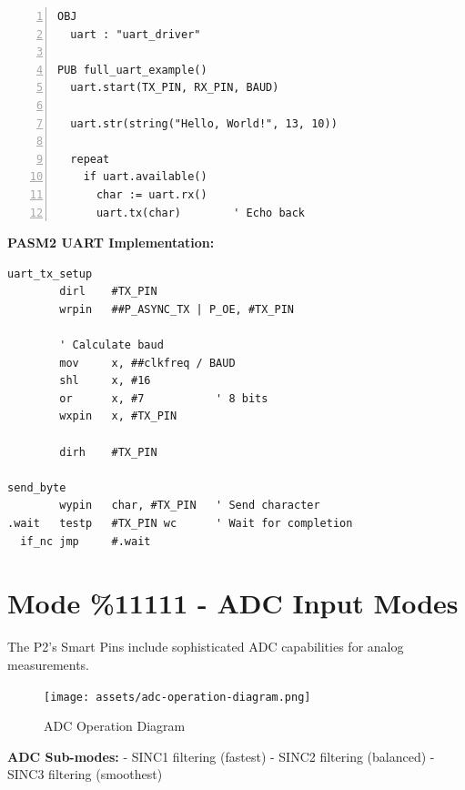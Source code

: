 \documentclass[11pt,a4paper,oneside,english]{book}
\begin{document}
\begin{Spin2Block}
\begin{Verbatim}[numbers=left,numbersep=5pt,xleftmargin=15pt]
OBJ
  uart : "uart_driver"
  
PUB full_uart_example()
  uart.start(TX_PIN, RX_PIN, BAUD)
  
  uart.str(string("Hello, World!", 13, 10))
  
  repeat
    if uart.available()
      char := uart.rx()
      uart.tx(char)        ' Echo back
\end{Verbatim}
\end{Spin2Block}

\textbf{PASM2 UART Implementation:}

\begin{PASM2Block}
\begin{lstlisting}
uart_tx_setup
        dirl    #TX_PIN
        wrpin   ##P_ASYNC_TX | P_OE, #TX_PIN
        
        ' Calculate baud
        mov     x, ##clkfreq / BAUD
        shl     x, #16
        or      x, #7           ' 8 bits
        wxpin   x, #TX_PIN
        
        dirh    #TX_PIN
        
send_byte
        wypin   char, #TX_PIN   ' Send character
.wait   testp   #TX_PIN wc      ' Wait for completion
  if_nc jmp     #.wait
\end{lstlisting}
\end{PASM2Block}

\clearpage

\hypertarget{mode-11111---adc-input-modes}{%
\section{Mode \%11111 - ADC Input
Modes}\label{mode-11111---adc-input-modes}}

The P2's Smart Pins include sophisticated ADC capabilities for analog
measurements.

\begin{figure}
\centering
\texttt{[image: assets/adc-operation-diagram.png]}
\caption{ADC Operation Diagram}
\end{figure}

\textbf{ADC Sub-modes:} - SINC1 filtering (fastest) - SINC2 filtering
(balanced) - SINC3 filtering (smoothest)
\end{document}
